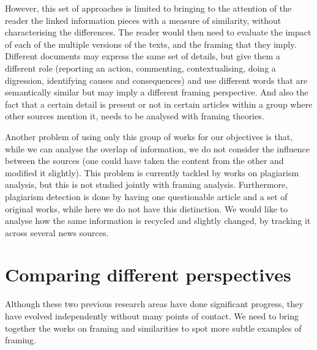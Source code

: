 However, this set of approaches is limited to bringing to the attention of the reader the linked information pieces with a measure of similarity, without characterising the differences.
The reader would then need to evaluate the impact of each of the multiple versions of the texts, and the framing that they imply. 
Different documents may express the same set of details, but give them a different role (reporting an action, commenting, contextualising, doing a digression, identifying causes and consequences) and use different words that are semantically similar but may imply a different framing perspective.
And also the fact that a certain detail is present or not in certain articles within a group where other sources mention it, needs to be analysed with framing theories.


Another problem of using only this group of works for our objectives is that, while we can analyse the overlap of information, we do not consider the influence between the sources (one could have taken the content from the other and modified it slightly).
This problem is currently tackled by works on plagiarism analysis, but this is not studied jointly with framing analysis.
Furthermore, plagiarism detection is done by having one questionable article and a set of original works, while here we do not have this distinction.
We would like to analyse how the same information is recycled and slightly changed, by tracking it across several news sources.




\section{Comparing different perspectives}
\label{sec:lit_gap}
Although these two previous research areas have done significant progress, they have evolved independently without many points of contact.
We need to bring together the works on framing and similarities to spot more subtle examples of framing.

